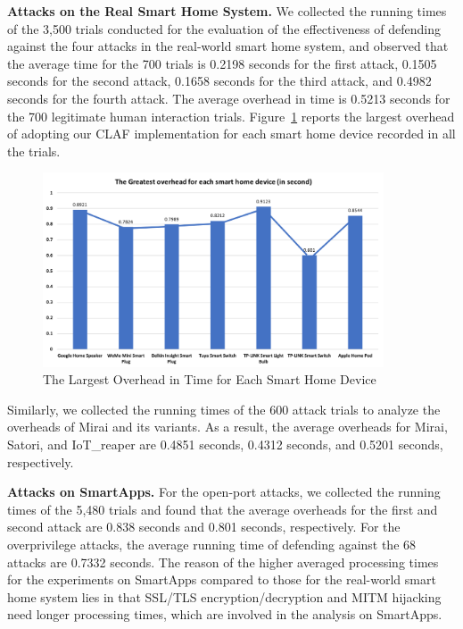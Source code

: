 \documentclass[letterpaper,12pt]{article}
\begin{document}
\textbf{Attacks on the Real Smart Home System.} 
We collected the running times of the 3,500 trials conducted for the evaluation of the effectiveness of defending against the four attacks in the real-world smart home system, and observed that the average time for the 700 trials is 0.2198 seconds for the first attack, 0.1505 seconds for the second attack, 0.1658 seconds for the third attack, and  0.4982 seconds for the fourth attack. The average overhead in time is 0.5213 seconds for the 700 legitimate human interaction trials. Figure~\ref{fig:overhead} reports the largest overhead of adopting our CLAF implementation for each smart home device recorded in all the trials. 

\begin{figure}[!htb]
        \centering
        \includegraphics[width=0.9\textwidth]{overhead.png}
        \caption{The Largest Overhead in Time for Each Smart Home Device}
        \label{fig:overhead}
\end{figure}

Similarly, we collected the running times of the 600 attack trials to analyze the overheads of Mirai and its variants. As a result, the average overheads for Mirai, Satori, and IoT\_reaper are 0.4851 seconds, 0.4312 seconds, and 0.5201 seconds, respectively.

\textbf{Attacks on SmartApps.} 
For the open-port attacks, we collected the running times of the 5,480 trials and found that the average overheads for the first and second attack are 0.838 seconds and 0.801 seconds, respectively. For the overprivilege attacks, the average running time of defending against the 68 attacks are 0.7332 seconds. The reason of the higher averaged processing times for the experiments on SmartApps compared to those for the real-world smart home system lies in that SSL/TLS encryption/decryption and MITM hijacking need longer processing times, which are involved in the analysis on SmartApps.
\end{document}

